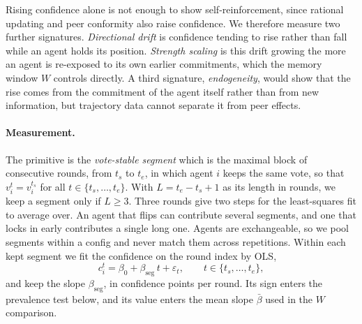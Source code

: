 Rising confidence alone is not enough to show self-reinforcement, since rational
updating and peer conformity also raise confidence. We therefore measure two
further signatures. \emph{Directional drift} is confidence tending to rise rather
than fall while an agent holds its position. \emph{Strength scaling} is this drift
growing the more an agent is re-exposed to its own earlier commitments, which the
memory window $W$ controls directly. A third signature, \emph{endogeneity}, would
show that the rise comes from the commitment of the agent itself rather than from new
information, but trajectory data cannot separate it from peer effects.

\paragraph{Measurement.}
The primitive is the \emph{vote-stable segment} which is the maximal block of consecutive
rounds, from $t_s$ to $t_e$, in which agent $i$ keeps the same vote, so that
$v_i^t = v_i^{t_s}$ for all $t \in \{t_s, \ldots, t_e\}$.
With $L = t_e - t_s + 1$ as its length in rounds, we keep a segment only if
$L \geq 3$. Three rounds give two steps for the
least-squares fit to average over. An agent that flips can contribute several
segments, and one that locks in early contributes a single long one. Agents are
exchangeable, so we pool segments within a config and never match them across
repetitions.
Within each kept segment we fit the confidence on the round index by \ac{OLS},
\begin{equation}
  c_i^t = \beta_0 + \beta_{\mathrm{seg}}\, t + \varepsilon_t,
  \qquad t \in \{t_s, \ldots, t_e\},
\end{equation}
and keep the slope $\beta_{\mathrm{seg}}$, in confidence points per round. Its sign
enters the prevalence test below, and its value enters the mean slope $\bar{\beta}$
used in the $W$ comparison.

